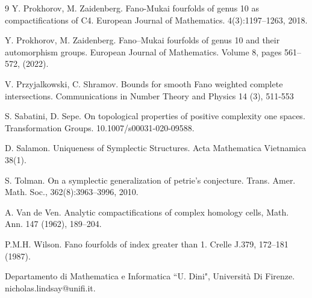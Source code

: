 \documentclass[12pt]{article}
\begin{document}
\begin{thebibliography}{9}
 Y. Prokhorov, M. Zaidenberg. Fano-Mukai fourfolds of genus 10 as compactifications of C4. European Journal of Mathematics. 4(3):1197–1263, 2018.


 Y. Prokhorov, M. Zaidenberg. Fano–Mukai fourfolds of genus 10 and their automorphism groups. European Journal of Mathematics. Volume 8, pages 561–572, (2022).

 V. Przyjalkowski, C. Shramov. Bounds for smooth Fano weighted complete intersections. Communications in Number Theory and Physics 14 (3), 511-553


 S. Sabatini, D. Sepe. On topological properties of positive complexity one spaces. Transformation
Groups. 10.1007/s00031-020-09588.

 D. Salamon. Uniqueness of Symplectic Structures. Acta Mathematica Vietnamica 38(1).


 S. Tolman. On a symplectic generalization of petrie’s conjecture. Trans. Amer. Math. Soc.,
362(8):3963–3996, 2010.

 A. Van de Ven. Analytic compactifications of complex homology cells, Math. Ann. 147 (1962), 189–204.

 P.M.H. Wilson. Fano fourfolds of index greater than 1. Crelle J.379, 172–181 (1987).





\end{thebibliography}

Departamento di Mathematica e Informatica ``U. Dini", Universit\`{a} Di  Firenze.\\

\noindent nicholas.lindsay@unifi.it.
\end{document}
